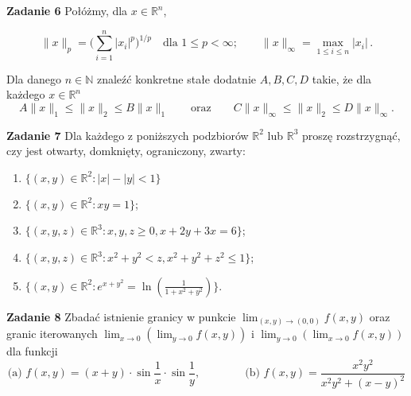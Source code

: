 \documentclass[a4paper,11pt]{article}
\newcommand{\dm}[1]{\displaystyle{#1}}
\begin{document}
\bigskip

\textbf{Zadanie 6} Połóżmy, dla $x\in \mathbb{R}^n$, 

\[
    \|x\|_p=\biggl(\sum_{i=1}^n|x_i|^p\biggr)^{1/p}\quad\mbox{dla
    $1\le p<\infty$}; \qquad \|x\|_\infty= \max_{1\le i\le n}
    |x_i|\, .
\]

    Dla danego $n\in \mathbb{N}$ znaleźć konkretne stałe dodatnie $A,B,C,D$
    takie, że dla każdego $x \in \mathbb{R}^n$ $$ A \|x\|_1 \leq \|x\|_2
    \leq B \|x\|_1 \qquad \text{oraz} \qquad C \|x\|_\infty \leq
    \|x\|_2 \leq D \|x\|_\infty. $$

\bigskip

\textbf{Zadanie 7} Dla każdego z poniższych podzbiorów $\mathbb{R}^2$ lub
$\mathbb{R}^3$ proszę rozstrzygnąć, czy jest otwarty, domknięty,
ograniczony, zwarty:

\begin{enumerate}
    \item $\{ (x,y) \in \mathbb{R}^2: |x| - |y| < 1 \}$
    \item $\{ (x,y) \in \mathbb{R}^2: xy = 1 \}$;
    \item $\{ (x,y,z) \in \mathbb{R}^3: x,y,z \geq 0, x+2y+3x = 6 \}$;
    \item $\{ (x,y,z) \in \mathbb{R}^3: x^2 + y^2 < z, x^2 + y^2 + z^2
        \leq 1 \}$;
    \item $\{ (x,y)\in \mathbb{R}^2: e^{x+y^2} =
        \ln(\frac{1}{1+x^2+y^2})\}$.  
\end{enumerate}

\bigskip

\textbf{Zadanie 8} Zbadać istnienie granicy w punkcie
$\dm{\lim_{(x,y)\to(0,0)} f(x,y) }$ oraz granic iterowanych $\dm{ \lim_{x
\to 0}\left( \lim_{y \to 0} f(x,y) \right) }$ i $\dm{ \lim_{y \to
0}\left( \lim_{x \to 0} f(x,y) \right) }$ dla funkcji $$ \text{(a) }
f(x,y) = (x+y)\cdot \sin\frac{1}{x} \cdot \sin\frac{1}{y}, \qquad \qquad
\text{(b) } f(x,y) = \dfrac{x^2y^2}{x^2y^2 +(x-y)^2} $$
\end{document}
